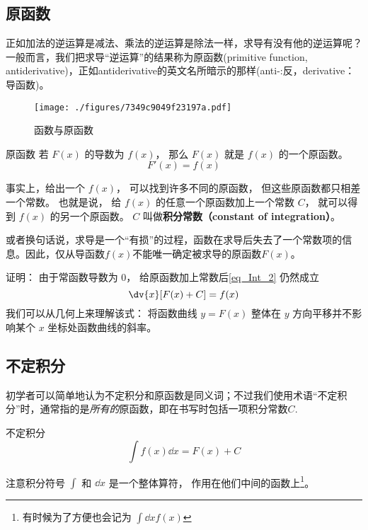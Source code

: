
\subsection{原函数}
正如加法的逆运算是减法、乘法的逆运算是除法一样，求导有没有他的逆运算呢？一般而言，我们把求导“逆运算”的结果称为原函数(primitive function, antiderivative)，正如antiderivative的英文名所暗示的那样(anti-:反，derivative：导函数)。

\begin{figure}[ht]
\centering
\texttt{[image: ./figures/7349c9049f23197a.pdf]}
\caption{函数与原函数} \label{fig_Int_1}
\end{figure}

\begin{definition}{原函数}
若 $F(x)$ 的导数为 $f(x)$， 那么 $F(x)$ 就是  $f(x)$ 的一个原函数。
\begin{equation}\label{eq_Int_2}
F'(x) = f(x)
\end{equation}
\end{definition}

\begin{theorem}{}
事实上，给出一个 $f(x)$， 可以找到许多不同的原函数， 但这些原函数都只相差一个常数。 也就是说， 给 $f(x)$ 的任意一个原函数加上一个常数 $C$， 就可以得到 $f(x)$ 的另一个原函数。 $C$ 叫做\textbf{积分常数（constant of integration）}。

或者换句话说，求导是一个“有损”的过程，函数在求导后失去了一个常数项的信息。因此，仅从导函数$f(x)$不能唯一确定被求导的原函数$F(x)$。
\end{theorem}

证明： 由于常函数导数为 $0$， 给原函数加上常数后\autoref{eq_Int_2} 仍然成立
\begin{equation}\label{eq_Int_3}
\dv{x} [F(x) + C] = f(x)
\end{equation}
我们可以从几何上来理解该式： 将函数曲线 $y = F(x)$ 整体在 $y$ 方向平移并不影响某个 $x$ 坐标处函数曲线的斜率。

\subsection{不定积分}
初学者可以简单地认为不定积分和原函数是同义词；不过我们使用术语“不定积分”时，通常指的是\textsl{所有的}原函数，即在书写时包括一项积分常数$C$.

\begin{definition}{不定积分}
\begin{equation}\label{eq_Int_1}
\int f(x) \dd{x} = F(x) + C
\end{equation}
\end{definition}
注意积分符号 $\int$ 和 $\dd{x}$ 是一个整体算符， 作用在他们中间的函数上\footnote{有时候为了方便也会记为 $\int\dd{x} f(x)$}。

